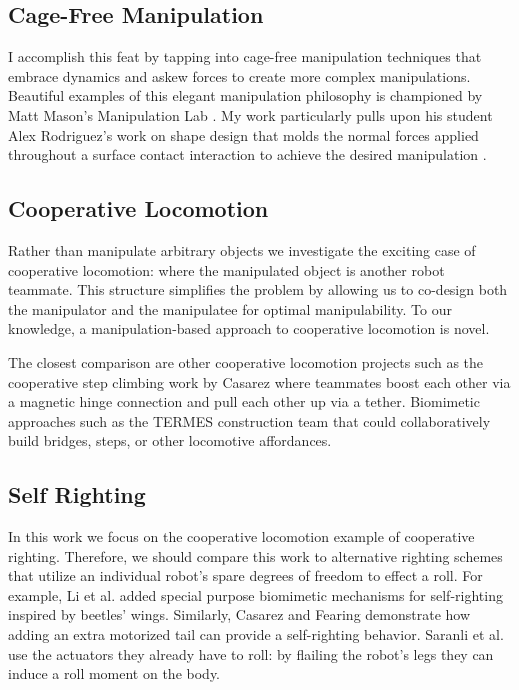 \documentclass[letterpaper]{report}
\begin{document}
\subsection{Cage-Free Manipulation}
I accomplish this feat by tapping into cage-free manipulation techniques that embrace dynamics and askew forces to create more complex manipulations.
Beautiful examples of this elegant manipulation philosophy is championed by Matt Mason's Manipulation Lab \cite{lynch1999dynamic}\cite{dafle2014extrinsic}.
My work particularly pulls upon his student Alex Rodriguez's work on shape design that molds the normal forces applied throughout a surface contact interaction to achieve the desired manipulation \cite{rodriguez2013effector}.

\subsection{Cooperative Locomotion}
Rather than manipulate arbitrary objects we investigate the exciting case of cooperative locomotion: where the manipulated object is another robot teammate.
This structure simplifies the problem by allowing us to co-design both the manipulator and the manipulatee for optimal manipulability.
To our knowledge, a manipulation-based approach to cooperative locomotion is novel.

The closest comparison are other cooperative locomotion projects such as the cooperative step climbing work by Casarez \cite{casarez2016step} where teammates boost each other via a magnetic hinge connection and pull each other up via a tether.
Biomimetic approaches such as the TERMES \cite{werfel2014designing} construction team that could collaboratively build bridges, steps, or other locomotive affordances.

\subsection{Self Righting}
In this work we focus on the cooperative locomotion example of cooperative righting.
Therefore, we should compare this work to alternative righting schemes that utilize an individual robot's spare degrees of freedom to effect a roll.
For example, Li et al. \cite{li2016cockroach} added special purpose biomimetic mechanisms for self-righting inspired by beetles' wings.
Similarly, Casarez and Fearing \cite{casarezTailRighting} demonstrate how adding an extra motorized tail can provide a self-righting behavior.
Saranli et al. \cite{saranli2004model} use the actuators they already have to roll: by flailing the robot's legs they can induce a roll moment on the body.
\end{document}
